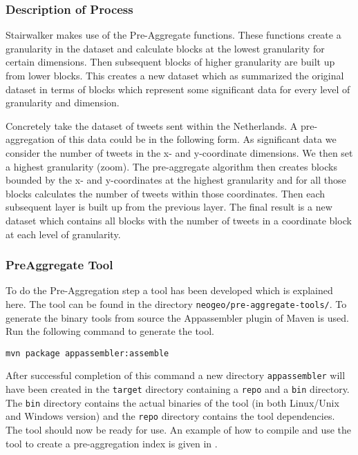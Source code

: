 \subsubsection{Description of Process}
Stairwalker makes use of the Pre-Aggregate functions. These functions create a granularity in the dataset and calculate blocks at the lowest granularity for certain dimensions. Then subsequent blocks of higher granularity are built up from lower blocks. This creates a new dataset which as summarized the original dataset in terms of blocks which represent some significant data for every level of granularity and dimension.

Concretely take the dataset of tweets sent within the Netherlands. A pre-aggregation of this data could be in the following form. As significant data we consider the number of tweets in the x- and y-coordinate dimensions. We then set a highest granularity (zoom). The pre-aggregate algorithm then creates blocks bounded by the x- and y-coordinates at the highest granularity and for all those blocks calculates the number of tweets within those coordinates. Then each subsequent layer is built up from the previous layer. The final result is a new dataset which contains all blocks with the number of tweets in a coordinate block at each level of granularity.

\subsubsection{PreAggregate Tool}
\label{sec:preaggtool}
To do the Pre-Aggregation step a tool has been developed which is explained here. The tool can be found in the directory \lstinline|neogeo/pre-aggregate-tools/|. To generate the binary tools from source the Appassembler plugin of Maven is used. Run the following command to generate the tool.
\begin{lstlisting}
mvn package appassembler:assemble
\end{lstlisting}
After successful completion of this command a new directory \lstinline|appassembler| will have been created in the \lstinline|target| directory containing a \lstinline|repo| and a \lstinline|bin| directory. The \lstinline|bin| directory contains the actual binaries of the tool (in both Linux/Unix and Windows version) and the \lstinline|repo| directory contains the tool dependencies. The tool should now be ready for use. An example of how to compile and use the tool to create a pre-aggregation index is given in .

